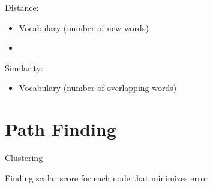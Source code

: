 \documentclass[10pt]{paper}
\begin{document}
Distance:
\begin{itemize}
  \item Vocabulary (number of new words)
  \item 
\end{itemize}

Similarity:
\begin{itemize}
  \item Vocabulary (number of overlapping words)
\end{itemize}


\section{Path Finding}

Clustering

Finding scalar score for each node that minimizes error
\end{document}

